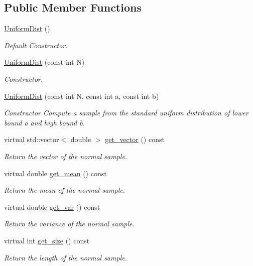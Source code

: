 \subsection*{Public Member Functions}
\begin{DoxyCompactItemize}
\item 
\mbox{\label{classUniformDist_aff015d27dc0cd334fa189e9a69df890b}} 
\hyperlink{classUniformDist_aff015d27dc0cd334fa189e9a69df890b}{Uniform\+Dist} ()
\begin{DoxyCompactList}\small\item\em Default Constructor. \end{DoxyCompactList}\item 
\hyperlink{classUniformDist_a723002562ed94ff786c30048268609cb}{Uniform\+Dist} (const int N)
\begin{DoxyCompactList}\small\item\em Constructor. \end{DoxyCompactList}\item 
\hyperlink{classUniformDist_ade2ddd82d83472112ce24c575880134d}{Uniform\+Dist} (const int N, const int a, const int b)
\begin{DoxyCompactList}\small\item\em Constructor Compute a sample from the standard uniform distribution of lower bound a and high bound b. \end{DoxyCompactList}\item 
virtual std\+::vector$<$ double $>$ \hyperlink{classUniformDist_a60df487bfb003628e9997ebcb5aedcde}{get\+\_\+vector} () const
\begin{DoxyCompactList}\small\item\em Return the vector of the normal sample. \end{DoxyCompactList}\item 
virtual double \hyperlink{classUniformDist_a18371ef0295e7aca4085015c0d844b41}{get\+\_\+mean} () const
\begin{DoxyCompactList}\small\item\em Return the mean of the normal sample. \end{DoxyCompactList}\item 
virtual double \hyperlink{classUniformDist_aade143a6ff9ed9a8bee2e6b9fb2fed4c}{get\+\_\+var} () const
\begin{DoxyCompactList}\small\item\em Return the variance of the normal sample. \end{DoxyCompactList}\item 
virtual int \hyperlink{classUniformDist_a6e7a871053b2eb563fcbf2f7e02fb22b}{get\+\_\+size} () const
\begin{DoxyCompactList}\small\item\em Return the length of the normal sample. \end{DoxyCompactList}\end{DoxyCompactItemize}
